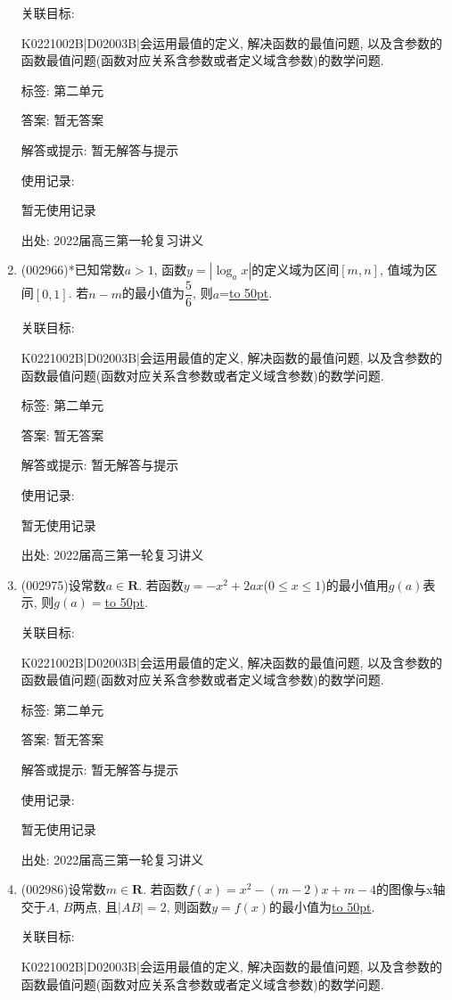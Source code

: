 \documentclass[10pt,a4paper]{article}
\newcommand{\blank}[1]{\underline{\hbox to #1pt{}}}
\begin{document}
\begin{enumerate}[1.]
关联目标:

K0221002B|D02003B|会运用最值的定义, 解决函数的最值问题, 以及含参数的函数最值问题(函数对应关系含参数或者定义域含参数)的数学问题.



标签: 第二单元

答案: 暂无答案

解答或提示: 暂无解答与提示

使用记录:

暂无使用记录


出处: 2022届高三第一轮复习讲义
\item { (002966)}*已知常数$a>1$, 函数$y=|\log_ax|$的定义域为区间$[m,n]$, 值域为区间$[0,1]$. 若$n-m$的最小值为$\dfrac 56$, 则$a$=\blank{50}.


关联目标:

K0221002B|D02003B|会运用最值的定义, 解决函数的最值问题, 以及含参数的函数最值问题(函数对应关系含参数或者定义域含参数)的数学问题.



标签: 第二单元

答案: 暂无答案

解答或提示: 暂无解答与提示

使用记录:

暂无使用记录


出处: 2022届高三第一轮复习讲义
\item { (002975)}设常数$a\in \mathbf{R}$. 若函数$y=-x^2+2ax$($0\le x\le 1$)的最小值用$g(a)$表示, 则$g(a)=$\blank{50}.


关联目标:

K0221002B|D02003B|会运用最值的定义, 解决函数的最值问题, 以及含参数的函数最值问题(函数对应关系含参数或者定义域含参数)的数学问题.



标签: 第二单元

答案: 暂无答案

解答或提示: 暂无解答与提示

使用记录:

暂无使用记录


出处: 2022届高三第一轮复习讲义
\item { (002986)}设常数$m\in \mathbf{R}$. 若函数$f(x)=x^2-(m-2)x+m-4$的图像与x轴交于$A$, $B$两点, 且$|AB|=2$, 则函数$y=f(x)$的最小值为\blank{50}.


关联目标:

K0221002B|D02003B|会运用最值的定义, 解决函数的最值问题, 以及含参数的函数最值问题(函数对应关系含参数或者定义域含参数)的数学问题.




\end{enumerate}
\end{document}
